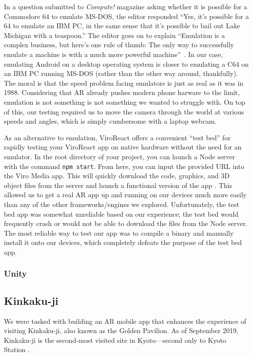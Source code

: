 \documentclass[a4paper, 10pt, american, titlepage]{article}
\begin{document}
In a question submitted to \textit{Compute!} magazine asking whether it is
possible for a Commodore 64 to emulate MS-DOS, the editor responded ``Yes, it's
possible for a 64 to emulate an IBM PC, in the same sense that it's possible to
bail out Lake Michigan with a teaspoon.'' The editor goes on to explain
``Emulation is a complex business, but here's one rule of thumb: The only way to
successfully emulate a machine is with a much more powerful
machine''~\autocite{warick1988}. In our case, emulating Android on a desktop
operating system is closer to emulating a C64 on an IBM PC running MS-DOS
(rather than the other way around, thankfully). The moral is that the speed
problem facing emulators is just as real as it was in 1988. Considering that AR
already pushes modern phone harware to the limit, emulation is not something is
not something we wanted to struggle with. On top of this, our testing required
us to move the camera through the world at various speeds and angles, which is
simply cumbersome with a laptop webcam.

As an alternative to emulation, ViroReact offers a convenient ``test bed'' for
rapidly testing your ViroReact app on native hardware without the need for an
emulator. In the root directory of your project, you can launch a Node server
with the command \texttt{npm start}. From here, you can input the provided URL
into the Viro Media app. This will quickly download the code, graphics, and 3D
object files from the server and launch a functional version of the app
\autocite{viro-testbed2019}. This allowed us to get a real AR app up and
running on our devices much more easily than any of the other
frameworks/engines we explored. Unfortunately, the test bed app was somewhat
unreliable based on our experience; the test bed would frequently crash or
would not be able to download the files from the Node server. The most reliable
way to test our app was to compile a binary and manually install it onto our
devices, which completely defeats the purpose of the test bed app.

\subsubsection{Unity}
\label{sec:unity}

\subsection{Kinkaku-ji}
\label{sec:kinkaku-ji}

We were tasked with building an AR mobile app that enhances the experience of
visiting Kinkaku-ji, also known as the Golden Pavilion. As of September 2019,
Kinkaku-ji is the second-most visited site in Kyoto---second only to Kyoto
Station \autocite{japanguide2019}.
\end{document}
